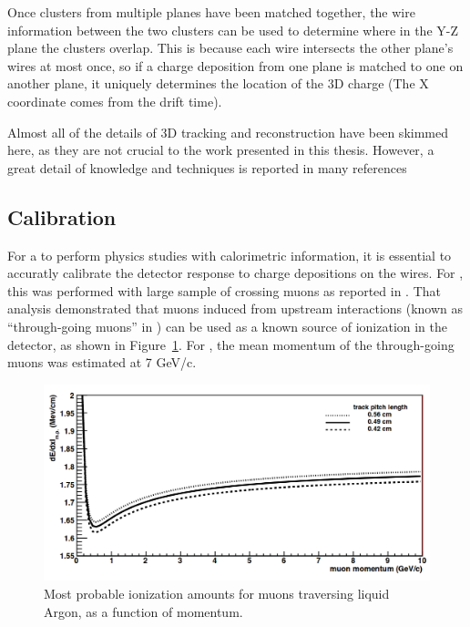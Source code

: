 Once clusters from multiple planes have been matched together, the wire information between the two clusters can be used to determine where in the Y-Z plane the clusters overlap.  This is because each wire intersects the other plane's wires at most once, so if a charge deposition from one plane is matched to one on another plane, it uniquely determines the location of the 3D charge (The X coordinate comes from the drift time).

Almost all of the details of 3D tracking and reconstruction have been skimmed here, as they are not crucial to the work presented in this thesis.  However, a great detail of knowledge and techniques is reported in many references \cite{reco:tracking_ref} \cite{reco:other_refs.}

\subsection{\label{subsec:lartpc_calibration} Calibration}

For a \lartpc to perform physics studies with calorimetric information, it is essential to accuratly calibrate the detector response to charge depositions on the wires.  For \argoneut, this was performed with large sample of crossing muons as reported in \cite{Anderson:2012mra}.  That analysis demonstrated that muons induced from upstream interactions (known as ``through-going muons'' in \argoneut) can be used as a known source of  ionization in the detector, as shown in Figure~\ref{fig:mpv_muons}.  For \argoneut, the mean momentum of the through-going muons was estimated at 7 GeV/c.

\begin{figure}[tb]
  \centering
  \includegraphics[width=\textwidth]{lartpc_figures/mpv_muons.png}
  \caption[Most Probable Ionization, Muons]{Most probable ionization amounts for muons traversing liquid Argon, as a function of momentum.}
  \label{fig:mpv_muons}
\end{figure}

